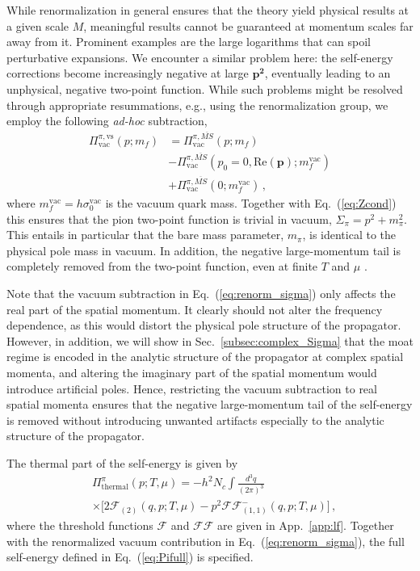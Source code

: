 \documentclass[reprint,english,superscriptaddress,preprintnumbers,amsmath,amssymb,aps,prd]{revtex4-2}
\def\Eq#1{Eq.~(\ref{#1})}
\def\Sec#1{Sec.~\ref{#1}}
\def\App#1{App.~\ref{#1}}
\begin{document}
While renormalization in general ensures that the theory yield physical results at a given scale $M$, meaningful results cannot be guaranteed at momentum scales far away from it. Prominent examples are the large logarithms that can spoil perturbative expansions. We encounter a similar problem here: the self-energy corrections become increasingly negative at large $\boldsymbol{p^2}$, eventually leading to an unphysical, negative two-point function. While such problems might be resolved through appropriate resummations, e.g., using the renormalization group, we employ the following \emph{ad-hoc} subtraction,
%
\begin{align}\label{eq:renorm_sigma}
\nonumber 
 \Pi^{\pi,\mathrm{vs}}_{\mathrm{vac}}(p;m_f)&=\Pi^{\pi,\overline{MS}}_{\mathrm{vac}}(p;m_f)\\[2ex] \nonumber
 &-\Pi^{\pi,\overline{MS}}_{\mathrm{vac}}(p_0=0,\mathrm{Re}(\boldsymbol{p});m_f^{\mathrm{vac}})\\[2ex]
 &+\Pi^{\pi,\overline{MS}}_{\mathrm{vac}}(0;m_f^{\mathrm{vac}})\,,
\end{align}
%
where $m_f^{\mathrm{vac}} = h \sigma_0^{\mathrm{vac}}$ is the vacuum quark mass. 
Together with \Eq{eq:Zcond} this ensures that the pion two-point function is trivial in vacuum, $\Sigma_\pi = p^2+m^2_\pi$. This entails in particular that the bare mass parameter, $m_\pi$, is identical to the physical pole mass in vacuum. In addition, the negative large-momentum tail is completely removed from the two-point function, even at finite $T$ and $\mu$ \cite{Rennecke:2025kub}.

Note that the vacuum subtraction in \Eq{eq:renorm_sigma} only affects the real part of the spatial momentum. It clearly should not alter the frequency dependence, as this would distort the physical pole structure of the propagator. However, in addition, we will show in \Sec{subsec:complex_Sigma} that the moat regime is encoded in the analytic structure of the propagator at complex spatial momenta, and altering the imaginary part of the spatial momentum would introduce artificial poles. Hence, restricting the vacuum subtraction to real spatial momenta ensures that the negative large-momentum tail of the self-energy is removed without introducing unwanted artifacts especially to the analytic structure of the propagator.
 
The thermal part of the self-energy is given by
%
\begin{align}\label{eq:Pi_thermal}
&\Pi^\pi_{\mathrm{thermal}}(p;T,\mu)=-h^2N_c\int\frac{d^3q}{(2\pi)^3}\nonumber\\[2ex]
&\times\bigg[2\mathcal{F}_{(2)}(q,p;T,\mu)-p^2\mathcal{FF}_{(1,1)}^-(q,p;T,\mu)\bigg]\,,
\end{align}
%
where the threshold functions $\mathcal{F}$ and $\mathcal{FF}$ are given in \App{app:lf}. 
Together with the renormalized vacuum contribution in \Eq{eq:renorm_sigma}, the full self-energy defined in \Eq{eq:Pifull} is specified.
\end{document}
